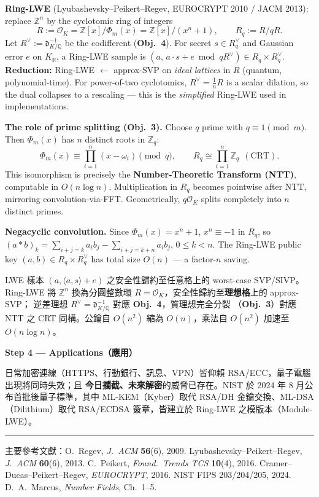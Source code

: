 \documentclass[12pt, a4paper]{article}
\begin{document}
\textbf{Ring-LWE} (Lyubashevsky--Peikert--Regev, EUROCRYPT 2010 / JACM 2013): replace
$\mathbb{Z}^n$ by the cyclotomic ring of integers
\[
  R := \mathcal{O}_K = \mathbb{Z}[x]/\Phi_m(x) = \mathbb{Z}[x]/(x^n+1), \qquad R_q := R/qR.
\]
Let $R^\vee:=\mathfrak{d}_{K/\mathbb{Q}}^{-1}$ be the codifferent (\textbf{Obj.\ 4}).
For secret $s\in R_q^\vee$ and Gaussian error $e$ on $K_\mathbb{R}$, a Ring-LWE sample is
$(a,\,a\!\cdot\!s+e\bmod qR^\vee)\in R_q\times R_q^\vee$.
\textbf{Reduction:} Ring-LWE $\longleftarrow$ approx-SVP on \textit{ideal lattices} in $R$
(quantum, polynomial-time). For power-of-two cyclotomics, $R^\vee=\tfrac{1}{n}R$ is a scalar
dilation, so the dual collapses to a rescaling — this is the \textit{simplified} Ring-LWE used
in implementations.

\textbf{The role of prime splitting (Obj.\ 3).} Choose $q$ prime with $q\equiv 1\pmod m$. Then
$\Phi_m(x)$ has $n$ distinct roots in $\mathbb{Z}_q$:
\[
  \Phi_m(x)\equiv\prod_{i=1}^{n}(x-\omega_i)\pmod q,
  \qquad R_q\cong\prod_{i=1}^{n}\mathbb{Z}_q\ \ (\text{CRT}).
\]
This isomorphism is precisely the \textbf{Number-Theoretic Transform (NTT)}, computable in
$O(n\log n)$. Multiplication in $R_q$ becomes pointwise after NTT, mirroring convolution-via-FFT.
Geometrically, $q\mathcal{O}_K$ splits completely into $n$ distinct primes.

\textbf{Negacyclic convolution.} Since $\Phi_m(x)=x^n+1$, $x^n\equiv-1$ in $R_q$, so
$(a*b)_k=\sum_{i+j=k}a_ib_j-\sum_{i+j=k+n}a_ib_j$, $0\leq k<n$. The Ring-LWE public key
$(a,b)\in R_q\times R_q^\vee$ has total size $O(n)$ — a factor-$n$ saving.

LWE 樣本 $(a,\langle a,s\rangle+e)$ 之安全性歸約至任意格上的 worst-case SVP/SIVP。Ring-LWE 將
$\mathbb{Z}^n$ 換為分圓整數環 $R=\mathcal{O}_K$，安全性歸約至\textbf{理想格}上的 approx-SVP；
逆差理想 $R^\vee=\mathfrak{d}_{K/\mathbb{Q}}^{-1}$ 對應 \textbf{Obj.\ 4}，質理想完全分裂
（\textbf{Obj.\ 3}）對應 NTT 之 CRT 同構。公鑰自 $O(n^2)$ 縮為 $O(n)$，乘法自 $O(n^2)$
加速至 $O(n\log n)$。

\medskip
\textbf{Step 4 --- Applications（應用）}

日常加密連線（HTTPS、行動銀行、訊息、VPN）皆仰賴 RSA/ECC，量子電腦出現將同時失效；且
\textbf{今日攔截、未來解密}的威脅已存在。NIST 於 2024 年 8 月公布首批後量子標準，其中
ML-KEM（Kyber）取代 RSA/DH 金鑰交換、ML-DSA（Dilithium）取代 RSA/ECDSA 簽章，皆建立於
Ring-LWE 之模版本（Module-LWE）。

\vspace{12pt}
\noindent\rule{\linewidth}{0.4pt}
\begin{center}
  \small\color{gray}
  主要參考文獻：O.\ Regev, \textit{J.\ ACM} \textbf{56}(6), 2009.\quad
  Lyubashevsky--Peikert--Regev, \textit{J.\ ACM} \textbf{60}(6), 2013.\quad
  C.\ Peikert, \textit{Found.\ Trends TCS} \textbf{10}(4), 2016.\quad
  Cramer--Ducas--Peikert--Regev, \textit{EUROCRYPT}, 2016.\quad
  NIST FIPS 203/204/205, 2024.\quad
  D.\ A.\ Marcus, \textit{Number Fields}, Ch.\ 1--5.
\end{center}
\end{document}
